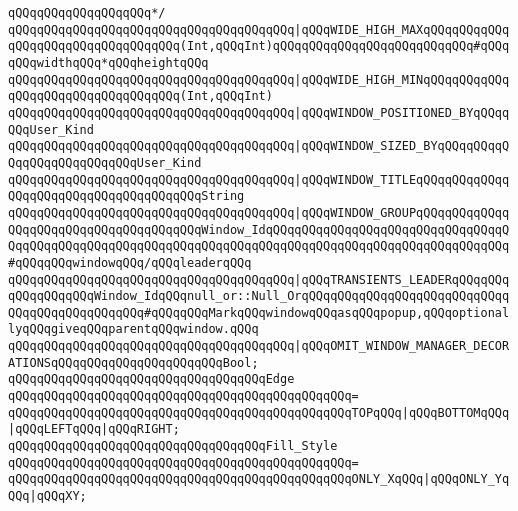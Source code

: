 \verb|qQQqqQQqqQQqqQQqqQQq*/|\newline
\verb|qQQqqQQqqQQqqQQqqQQqqQQqqQQqqQQqqQQqqQQq|\verb#|qQQqWIDE_HIGH_MAXqQQqqQQqqQQqqQQqqQQqqQQqqQQqqQQqqQQq(Int,qQQqInt)qQQqqQQqqQQqqQQqqQQqqQQqqQQq#\verb|#qQQqqQQqwidthqQQq*qQQqheightqQQq|\newline
\verb|qQQqqQQqqQQqqQQqqQQqqQQqqQQqqQQqqQQqqQQq|\verb#|qQQqWIDE_HIGH_MINqQQqqQQqqQQqqQQqqQQqqQQqqQQqqQQqqQQq(Int,qQQqInt)#\newline
\verb|qQQqqQQqqQQqqQQqqQQqqQQqqQQqqQQqqQQqqQQq|\verb#|qQQqWINDOW_POSITIONED_BYqQQqqQQqUser_Kind#\newline
\verb|qQQqqQQqqQQqqQQqqQQqqQQqqQQqqQQqqQQqqQQq|\verb#|qQQqWINDOW_SIZED_BYqQQqqQQqqQQqqQQqqQQqqQQqqQQqUser_Kind#\newline
\verb|qQQqqQQqqQQqqQQqqQQqqQQqqQQqqQQqqQQqqQQq|\verb#|qQQqWINDOW_TITLEqQQqqQQqqQQqqQQqqQQqqQQqqQQqqQQqqQQqqQQqString#\newline
\verb|qQQqqQQqqQQqqQQqqQQqqQQqqQQqqQQqqQQqqQQq|\verb#|qQQqWINDOW_GROUPqQQqqQQqqQQqqQQqqQQqqQQqqQQqqQQqqQQqqQQqWindow_IdqQQqqQQqqQQqqQQqqQQqqQQqqQQqqQQqqQQqqQQqqQQqqQQqqQQqqQQqqQQqqQQqqQQqqQQqqQQqqQQqqQQqqQQqqQQqqQQqqQQqqQQq#\verb|#qQQqqQQqwindowqQQq/qQQqleaderqQQq|\newline
\verb|qQQqqQQqqQQqqQQqqQQqqQQqqQQqqQQqqQQqqQQq|\verb#|qQQqTRANSIENTS_LEADERqQQqqQQqqQQqqQQqqQQqWindow_IdqQQqnull_or::Null_OrqQQqqQQqqQQqqQQqqQQqqQQqqQQqqQQqqQQqqQQqqQQqqQQq#\verb|#qQQqqQQqMarkqQQqwindowqQQqasqQQqpopup,qQQqoptionallyqQQqgiveqQQqparentqQQqwindow.qQQq|\newline
\verb|qQQqqQQqqQQqqQQqqQQqqQQqqQQqqQQqqQQqqQQq|\verb#|qQQqOMIT_WINDOW_MANAGER_DECORATIONSqQQqqQQqqQQqqQQqqQQqqQQqBool;#\newline
\newline
\verb|qQQqqQQqqQQqqQQqqQQqqQQqqQQqqQQqqQQqEdge|\newline
\verb|qQQqqQQqqQQqqQQqqQQqqQQqqQQqqQQqqQQqqQQqqQQqqQQq=|\newline
\verb|qQQqqQQqqQQqqQQqqQQqqQQqqQQqqQQqqQQqqQQqqQQqqQQqTOPqQQq|\verb#|qQQqBOTTOMqQQq|qQQqLEFTqQQq|qQQqRIGHT;#\newline
\newline
\verb|qQQqqQQqqQQqqQQqqQQqqQQqqQQqqQQqqQQqFill_Style|\newline
\verb|qQQqqQQqqQQqqQQqqQQqqQQqqQQqqQQqqQQqqQQqqQQqqQQq=|\newline
\verb|qQQqqQQqqQQqqQQqqQQqqQQqqQQqqQQqqQQqqQQqqQQqqQQqONLY_XqQQq|\verb#|qQQqONLY_YqQQq|qQQqXY;#\newline
\newline
